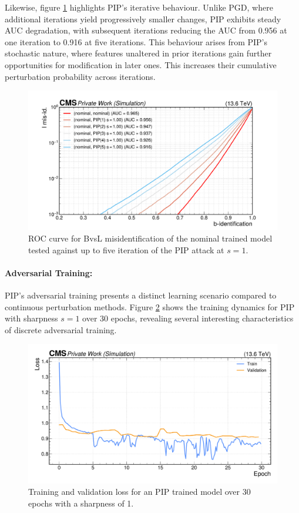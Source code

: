 Likewise, figure \ref{fig:intprob_rocs_vs_iterations} highlights PIP's iterative behaviour. Unlike PGD, where additional iterations yield progressively smaller changes, PIP exhibits steady AUC degradation, with subsequent iterations reducing the AUC from 0.956 at one iteration to 0.916 at five iterations. This behaviour arises from PIP's stochastic nature, where features unaltered in prior iterations gain further opportunities for modification in later ones. This increases their cumulative perturbation probability across iterations.


\begin{figure}[h]
\centering
    \includegraphics[width=15cm]{media/output/roc_bvsl_intprob_iterations.pdf}
    \caption{ROC curve for BvsL misidentification of the nominal trained model tested against up to five iteration of the PIP attack at $s=1$.}
    \label{fig:intprob_rocs_vs_iterations}
\end{figure}

\paragraph{Adversarial Training:} PIP's adversarial training presents a distinct learning scenario compared to continuous perturbation methods. 
Figure \ref{fig:intprob_training} shows the training dynamics for PIP with sharpness $s=1$ over 30 epochs, revealing several interesting characteristics of discrete adversarial training.

\begin{figure}[h]
\centering
    \includegraphics[width=15cm]{media/output/intprob_loss_validation.pdf}
    \caption{Training and validation loss for an PIP trained model over 30 epochs with a sharpness of 1.}
    \label{fig:intprob_training}
\end{figure}

